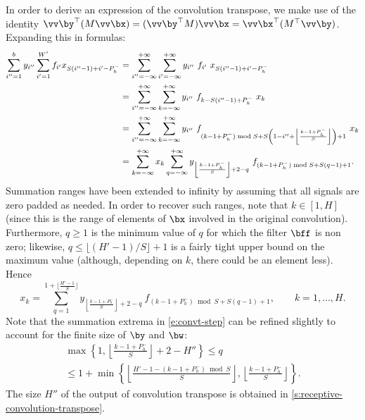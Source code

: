 In order to derive an expression of the convolution transpose,  we make use of the identity $\vv \by^\top (M \vv \bx) = (\vv \by^\top M) \vv\bx = \vv\bx^\top (M^\top \vv\by)$. Expanding this in formulas:
\begin{align*}
\sum_{i''=1}^b y_{i''} 
\sum_{i'=1}^{W'} f_{i'} x_{S (i''-1) + i'  -P_h^-}
&=
\sum_{i''=-\infty}^{+\infty}
\sum_{i'=-\infty}^{+\infty} 
y_{i''}\ f_{i'}\ x_{S (i''-1) + i'  -P_h^-}
\\
&=
\sum_{i''=-\infty}^{+\infty}
\sum_{k=-\infty}^{+\infty} 
y_{i''}\ f_{k-S(i'' -1) + P_h^-}\ x_{k}
\\
&=
\sum_{i''=-\infty}^{+\infty}
\sum_{k=-\infty}^{+\infty} 
y_{i''}%
\ %
f_{%
(k-1+ P_h^-) \bmod S +
S \left(1 -i''  + \left\lfloor \frac{k-1+ P_h^-}{S} \right\rfloor\right)+1
}\ x_{k}
\\
&=
\sum_{k=-\infty}^{+\infty} 
x_{k}
\sum_{q=-\infty}^{+\infty}
y_{\left\lfloor \frac{k-1+ P_h^-}{S} \right\rfloor + 2 - q}
\ %
f_{(k-1+ P_h^-)\bmod S +S(q - 1)+1}.
\end{align*}
Summation ranges have been extended to infinity by assuming that all signals are zero padded as needed. In order to recover such ranges, note that $k \in [1,H]$ (since this is the range of elements of $\bx$ involved in the original convolution). Furthermore, $q\geq 1$ is the minimum value of $q$ for which the filter $\bff$ is non zero; likewise, $q\leq \lfloor (H'-1)/S\rfloor +1$ is a fairly tight upper bound on the maximum value (although, depending on $k$, there could be an element less). Hence
\begin{equation}\label{e:convt-step}
 x_k = 
 \sum_{q=1}^{1 + \lfloor \frac{H'-1}{S} \rfloor}
y_{\left\lfloor \frac{k-1+ P_h^-}{S} \right\rfloor + 2 - q}\ %
f_{(k-1+ P_h^-)\bmod S +S(q - 1)+1},
\qquad k=1,\dots, H.
\end{equation}
Note that the summation extrema in \eqref{e:convt-step} can be refined slightly to account for the finite size of $\by$ and $\bw$:
\begin{multline*}
\max\left\{
1, 
\left\lfloor \frac{k-1 + P_h^-}{S} \right\rfloor + 2 - H''
\right\}
\leq q \\
\leq
1 +\min\left\{
\left\lfloor \frac{H'-1-(k-1+ P_h^-)\bmod S}{S} \right\rfloor, 
\left\lfloor \frac{k-1 + P_h^-}{S} \right\rfloor
\right\}.
\end{multline*}
The size $H''$ of the output of convolution transpose is obtained in \cref{s:receptive-convolution-transpose}.

